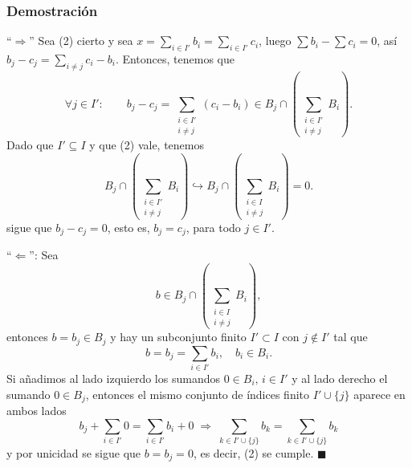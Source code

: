 \documentclass[notes=show]{beamer}%
\begin{document}
\begin{frame}
    \frametitle{Demostración}

    ``\(\Rightarrow\)'' Sea (2) cierto y sea \( x = \sum_{i \in I'} b_i = \sum_{i \in I'} c_i \), luego \(\sum b_i - \sum c_i = 0\),
    así   \(b_j - c_j = \sum_{i\neq j} c_i - b_i\). Entonces, tenemos que
    \[
    \forall j \in I': \qquad b_j - c_j = \sum_{\substack{i \in I' \\ i \neq j}} (c_i - b_i) \in B_j \cap \left( \sum_{\substack{i \in I' \\ i \neq j}} B_i  \right).
    \]
    Dado que \(I'\subseteq I\) y que (2) vale, tenemos
    \[
    B_j \cap \left( \sum_{\substack{i \in I' \\ i \neq j}} B_i \right) \hookrightarrow B_j \cap \left( \sum_{\substack{i \in I \\ i \neq j}} B_i \right) = 0.
    \]
    sigue que \( b_j - c_j = 0 \), esto es, \( b_j = c_j \), para todo \( j \in I' \).
\end{frame}

\begin{frame}
``\(\Leftarrow\)'': Sea
\[
b \in B_j \cap \left( \sum_{\substack{i \in I \\ i \neq j}} B_i \right),
\]
entonces \( b = b_j \in B_j \) y hay un subconjunto finito \( I' \subset I \) con \( j \notin I' \) tal que
\[
b = b_j = \sum_{i \in I'} b_i, \quad b_i \in B_i.
\]
Si añadimos al lado izquierdo los sumandos \( 0 \in B_i, \, i \in I' \) y al lado derecho el sumando \( 0 \in B_j \), 
entonces el mismo conjunto de índices finito \( I' \cup \{j\} \) aparece en ambos lados
\[ 
    b_j + \sum_{i \in I'} 0 =  \sum_{i \in I'} b_i + 0 \; \Rightarrow \; \sum_{k \in I'\cup \{j\}} b_k =  \sum_{k \in I'\cup \{j\} } b_k
\]
y por unicidad se sigue que \( b = b_j = 0 \), es decir, (2) se cumple. \hfill \(\blacksquare\)
\end{frame}
\end{document}
